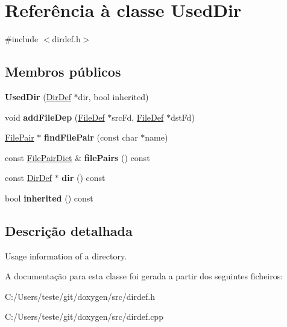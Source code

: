 \hypertarget{class_used_dir}{\section{Referência à classe Used\-Dir}
\label{class_used_dir}
}


{\ttfamily \#include $<$dirdef.\-h$>$}

\subsection*{Membros públicos}
\begin{DoxyCompactItemize}
\item 
\hypertarget{class_used_dir_a69707264dd9c3882abe35ca1bccf07f3}{{\bfseries Used\-Dir} (\hyperlink{class_dir_def}{Dir\-Def} $\ast$dir, bool inherited)}\label{class_used_dir_a69707264dd9c3882abe35ca1bccf07f3}

\item 
\hypertarget{class_used_dir_afe1f0680bc3d604e4c4f6b60d633814b}{void {\bfseries add\-File\-Dep} (\hyperlink{class_file_def}{File\-Def} $\ast$src\-Fd, \hyperlink{class_file_def}{File\-Def} $\ast$dst\-Fd)}\label{class_used_dir_afe1f0680bc3d604e4c4f6b60d633814b}

\item 
\hypertarget{class_used_dir_aacd9dfb78dfb6f128de5d029695082ae}{\hyperlink{class_file_pair}{File\-Pair} $\ast$ {\bfseries find\-File\-Pair} (const char $\ast$name)}\label{class_used_dir_aacd9dfb78dfb6f128de5d029695082ae}

\item 
\hypertarget{class_used_dir_a8d40b601a241196fa689e27bee3c7e3c}{const \hyperlink{class_file_pair_dict}{File\-Pair\-Dict} \& {\bfseries file\-Pairs} () const }\label{class_used_dir_a8d40b601a241196fa689e27bee3c7e3c}

\item 
\hypertarget{class_used_dir_a2caea3e0c516ddc62186502bdd1f7f5e}{const \hyperlink{class_dir_def}{Dir\-Def} $\ast$ {\bfseries dir} () const }\label{class_used_dir_a2caea3e0c516ddc62186502bdd1f7f5e}

\item 
\hypertarget{class_used_dir_afdd1d41f0a371a2956580cba16773620}{bool {\bfseries inherited} () const }\label{class_used_dir_afdd1d41f0a371a2956580cba16773620}

\end{DoxyCompactItemize}


\subsection{Descrição detalhada}
Usage information of a directory. 

A documentação para esta classe foi gerada a partir dos seguintes ficheiros\-:\begin{DoxyCompactItemize}
\item 
C\-:/\-Users/teste/git/doxygen/src/dirdef.\-h\item 
C\-:/\-Users/teste/git/doxygen/src/dirdef.\-cpp\end{DoxyCompactItemize}
